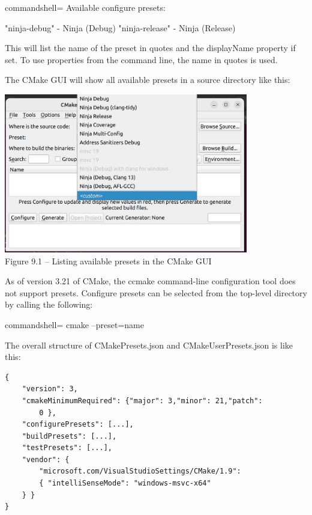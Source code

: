\begin{tcblisting}{commandshell={}}
Available configure presets:

  "ninja-debug" - Ninja (Debug)
  "ninja-release" - Ninja (Release)
\end{tcblisting}

This will list the name of the preset in quotes and the displayName property if set. To use properties from the command line, the name in quotes is used.

The CMake GUI will show all available presets in a source directory like this:

\begin{center}
\includegraphics[width=0.8\textwidth]{content/2/chapter9/images/2.jpg}\\
Figure 9.1 – Listing available presets in the CMake GUI
\end{center}

As of version 3.21 of CMake, the ccmake command-line configuration tool does not support presets. Configure presets can be selected from the top-level directory by calling the following:

\begin{tcblisting}{commandshell={}}
cmake --preset=name
\end{tcblisting}

The overall structure of CMakePresets.json and CMakeUserPresets.json is like this:

\begin{lstlisting}[style=styleCMake]
{
	"version": 3,
	"cmakeMinimumRequired": {"major": 3,"minor": 21,"patch":
		0 },
	"configurePresets": [...],
	"buildPresets": [...],
	"testPresets": [...],
	"vendor": {
		"microsoft.com/VisualStudioSettings/CMake/1.9":
		{ "intelliSenseMode": "windows-msvc-x64"
	} }
}
\end{lstlisting}

